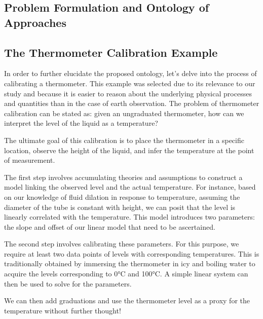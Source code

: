 \begin{bibunit}

\clearemptydoublepage
\chapter{Problem Formulation and Ontology of Approaches}
\label{chap:1}
\section{The Thermometer Calibration Example}
In order to further elucidate the proposed ontology, let's delve into the process of calibrating a thermometer. This example was selected due to its relevance to our study and because it is easier to reason about the underlying physical processes and quantities than in the case of earth observation. The problem of thermometer calibration can be stated as: given an ungraduated thermometer, how can we interpret the level of the liquid as a temperature?

The ultimate goal of this calibration is to place the thermometer in a specific location, observe the height of the liquid, and infer the temperature at the point of measurement.

The first step involves accumulating theories and assumptions to construct a model linking the observed level and the actual temperature. For instance, based on our knowledge of fluid dilation in response to temperature, assuming the diameter of the tube is constant with height, we can posit that the level is linearly correlated with the temperature. This model introduces two parameters: the slope and offset of our linear model that need to be ascertained.

The second step involves calibrating these parameters. For this purpose, we require at least two data points of levels with corresponding temperatures. This is traditionally obtained by immersing the thermometer in icy and boiling water to acquire the levels corresponding to 0°C and 100°C. A simple linear system can then be used to solve for the parameters.

We can then add graduations and use the thermometer level as a proxy for the temperature without further thought!


\end{bibunit}
